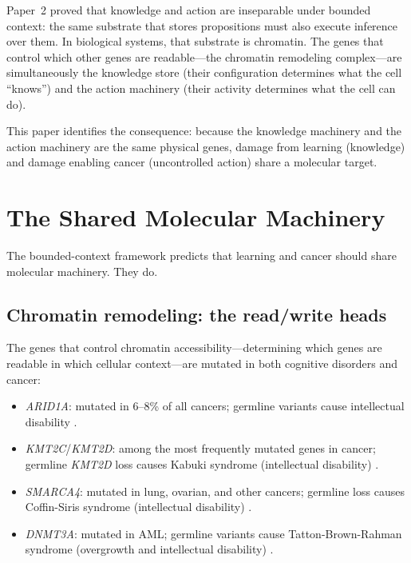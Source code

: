 \documentclass[11pt]{article}
\theoremstyle{definition}
\begin{document}
Paper~2 \cite{McCarthy2026b} proved that knowledge and action
are inseparable under bounded context: the same substrate that
stores propositions must also execute inference over them.
In biological systems, that substrate is chromatin. The genes
that control which other genes are readable---the chromatin
remodeling complex---are simultaneously the knowledge store
(their configuration determines what the cell ``knows'') and
the action machinery (their activity determines what the cell
can do).

This paper identifies the consequence: because the knowledge
machinery and the action machinery are the same physical genes,
damage from learning (knowledge) and damage enabling cancer
(uncontrolled action) share a molecular target.

\section{The Shared Molecular Machinery}
\label{sec:machinery}

The bounded-context framework predicts that learning and cancer
should share molecular machinery. They do.

\subsection{Chromatin remodeling: the read/write heads}

The genes that control chromatin accessibility---determining which
genes are readable in which cellular context---are mutated in both
cognitive disorders and cancer:

\begin{itemize}
\item \emph{ARID1A}: mutated in 6--8\% of all cancers; germline
variants cause intellectual disability \cite{Santen2012}.
\item \emph{KMT2C}/\emph{KMT2D}: among the most frequently mutated
genes in cancer; germline \emph{KMT2D} loss causes Kabuki syndrome
(intellectual disability) \cite{Miyake2013}.
\item \emph{SMARCA4}: mutated in lung, ovarian, and other cancers;
germline loss causes Coffin-Siris syndrome (intellectual
disability) \cite{Tsurusaki2012}.
\item \emph{DNMT3A}: mutated in AML; germline variants cause
Tatton-Brown-Rahman syndrome (overgrowth and intellectual
disability) \cite{Tatton-Brown2014}.
\end{itemize}
\end{document}
